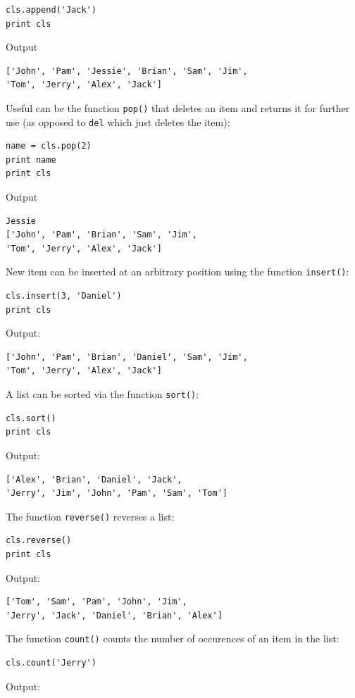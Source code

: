\documentclass[article,A4,12pt]{llncs}
\begin{document}
\begin{verbatim}
cls.append('Jack')
print cls
\end{verbatim}
Output

\begin{verbatim}
['John', 'Pam', 'Jessie', 'Brian', 'Sam', 'Jim', 
'Tom', 'Jerry', 'Alex', 'Jack']
\end{verbatim}
Useful can be the function {\tt pop()} that deletes an item and returns it for further
use (as opposed to {\tt del} which just deletes the item):

\begin{verbatim}
name = cls.pop(2)
print name 
print cls
\end{verbatim}
Output

\begin{verbatim}
Jessie
['John', 'Pam', 'Brian', 'Sam', 'Jim', 
'Tom', 'Jerry', 'Alex', 'Jack']
\end{verbatim}
New item can be inserted at an arbitrary position using the function {\tt insert()}:

\begin{verbatim}
cls.insert(3, 'Daniel')
print cls
\end{verbatim}
Output:

\begin{verbatim}
['John', 'Pam', 'Brian', 'Daniel', 'Sam', 'Jim', 
'Tom', 'Jerry', 'Alex', 'Jack']
\end{verbatim}
A list can be sorted via the function {\tt sort()}:

\begin{verbatim}
cls.sort()
print cls
\end{verbatim}
Output:

\begin{verbatim}
['Alex', 'Brian', 'Daniel', 'Jack', 
'Jerry', 'Jim', 'John', 'Pam', 'Sam', 'Tom']
\end{verbatim}
The function {\tt reverse()} reverses a list:

\begin{verbatim}
cls.reverse()
print cls
\end{verbatim}
Output:

\begin{verbatim}
['Tom', 'Sam', 'Pam', 'John', 'Jim', 
'Jerry', 'Jack', 'Daniel', 'Brian', 'Alex']
\end{verbatim}
The function {\tt count()} counts the number of occurences of an item
in the list:

\begin{verbatim}
cls.count('Jerry')
\end{verbatim}
Output:
\end{document}
